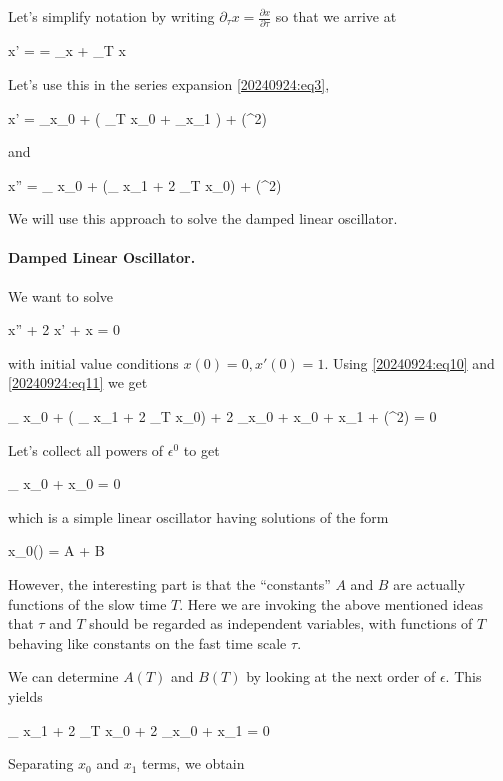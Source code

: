 Let's simplify notation by writing $\partial_\tau x = \frac{\partial x}{\partial \tau}$ so that we arrive at

\bee
x' =  = \partial_\tau x + \epsilon \partial_T x
\eee

Let's use this in the series expansion \eqref{20240924:eq3},

\be\label{20240924:eq10}
x' = \partial_\tau x_0 + \epsilon ( \partial_T x_0 + \partial_\tau x_1 ) + \Oc(\epsilon^2)
\ee

and

\be\label{20240924:eq11}
x'' = \partial_{\tau \tau} x_0 + \epsilon (\partial_{\tau \tau} x_1 + 2 \partial_{T \tau} x_0) + \Oc(\epsilon^2)
\ee

We will use this approach to solve the damped linear oscillator.

\paragraph{Damped Linear Oscillator.} We want to solve

\bee
x'' + 2 \epsilon x' + x = 0
\eee

with initial value conditions $x(0) = 0, x'(0) = 1$. Using \eqref{20240924:eq10} and \eqref{20240924:eq11} we get 

\bee
\partial_{\tau \tau} x_0 + \epsilon ( \partial_{\tau \tau} x_1  + 2 \partial_{T \tau} x_0) + 2 \epsilon \partial_\tau x_0 + x_0  + \epsilon x_1 + \Oc(\epsilon^2) = 0
\eee

Let's collect all powers of $\epsilon^0$ to get

\bee
\partial_{\tau \tau} x_0 + x_0 = 0
\eee

which is a simple linear oscillator having solutions of the form

\bee
x_0(\tau) = A \sin \tau + B \cos \tau
\eee

However, the interesting part is that the “constants” $A$ and $B$ are actually functions of the slow time $T$. Here we are invoking the above mentioned ideas that $\tau$ and $T$ should be regarded as independent variables, with functions of $T$ behaving like constants on the fast time scale $\tau$.

We can determine $A(T)$ and $B(T)$ by looking at the next order of $\epsilon$. This yields

\bee
\partial_{\tau \tau} x_1  + 2 \partial_{T \tau} x_0 + 2 \partial_\tau x_0 + x_1 = 0
\eee

Separating $x_0$ and $x_1$ terms, we obtain

